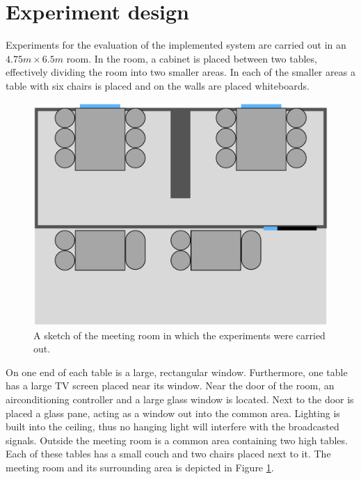 \section{Experiment design}\label{sec:experiment_design}
Experiments for the evaluation of the implemented system are carried out in an $4.75m \times 6.5m$ room.
In the room, a cabinet is placed between two tables, effectively dividing the room into two smaller areas. 
In each of the smaller areas a table with six chairs is placed and on the walls are placed whiteboards.
\begin{figure}[h]
    \centering
    \includegraphics[scale=0.5]{images/experiment_room.png}
    \caption{A sketch of the meeting room in which the experiments were carried out.}
    \label{fig:experiment_room}
\end{figure}
On one end of each table is a large, rectangular window.
Furthermore, one table has a large TV screen placed near its window. 
Near the door of the room, an airconditioning controller and a large glass window is located. 
Next to the door is placed a glass pane, acting as a window out into the common area. 
Lighting is built into the ceiling, thus no hanging light will interfere with the broadcasted signals. 
Outside the meeting room is a common area containing two high tables.
Each of these tables has a small couch and two chairs placed next to it.
The meeting room and its surrounding area is depicted in Figure \ref{fig:experiment_room}.

